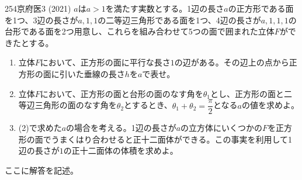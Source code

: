 \begin{thm}{254}{}{京府医3 (2021)}
 $a$は$a>1$を満たす実数とする。1辺の長さ$a$の正方形である面を1つ、3辺の長さが$a,1,1$の二等辺三角形である面を1つ、4辺の長さが$a,1,1,1$の台形である面を2つ用意し、これらを組み合わせて5つの面で囲まれた立体$F$ができたとする。
 \begin{enumerate}
  \item 立体$F$において、正方形の面に平行な長さ$1$の辺がある。その辺上の点から正方形の面に引いた垂線の長さ$h$を$a$で表せ。
  \item 立体$F$において、正方形の面と台形の面のなす角を$\theta_1$とし、正方形の面と二等辺三角形の面のなす角を$\theta_2$とするとき、$\theta_1+\theta_2=\dfrac{\pi}{2}$となる$a$の値を求めよ。
  \item (2)で求めた$a$の場合を考える。1辺の長さが$a$の立方体にいくつかの$F$を正方形の面でうまくはり合わせると正十二面体ができる。この事実を利用して1辺の長さが$1$の正十二面体の体積を求めよ。
 \end{enumerate}
\end{thm}

ここに解答を記述。